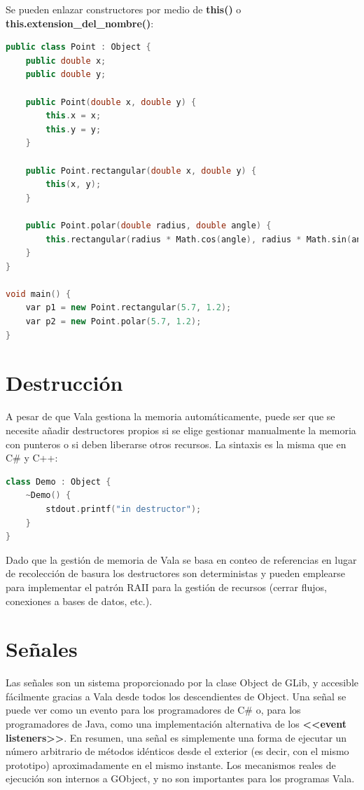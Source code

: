\documentclass[12pt,twoside]{book}
\begin{document}
Se pueden enlazar constructores por medio de \textbf{this()} o \textbf{this.extension\_del\_nombre()}:

\begin{lstlisting}[language=C++]
public class Point : Object {
	public double x;
	public double y;
	
	public Point(double x, double y) {
		this.x = x;
		this.y = y;
	}
	
	public Point.rectangular(double x, double y) {
		this(x, y);
	}
	
	public Point.polar(double radius, double angle) {
		this.rectangular(radius * Math.cos(angle), radius * Math.sin(angle));
	}
}

void main() {
	var p1 = new Point.rectangular(5.7, 1.2);
	var p2 = new Point.polar(5.7, 1.2);
}
\end{lstlisting}

\section{Destrucción}

A pesar de que Vala gestiona la memoria automáticamente, puede ser que se necesite añadir destructores propios si se elige gestionar manualmente la memoria con punteros  o si deben liberarse otros recursos. La sintaxis es la misma que en C\# y C++:

\begin{lstlisting}[language=C++]
class Demo : Object {
	~Demo() {
		stdout.printf("in destructor");
	}
}
\end{lstlisting}

Dado que la gestión de memoria de Vala se basa en conteo de referencias en lugar de recolección de basura los destructores son deterministas y pueden emplearse para implementar el patrón RAII para la gestión de recursos (cerrar flujos, conexiones a bases de datos, etc.).

\section{Señales}

Las señales son un sistema proporcionado por la clase Object de GLib, y accesible fácilmente gracias a Vala desde todos los descendientes de Object. Una señal se puede ver como un evento para los programadores de C\# o, para los programadores de Java, como una implementación alternativa de los \textbf{<<event listeners>>}. En resumen, una señal es simplemente una forma de ejecutar un número arbitrario de métodos idénticos desde el exterior (es decir, con el mismo prototipo) aproximadamente en el mismo instante. Los mecanismos reales de ejecución son internos a GObject, y no son importantes para los programas Vala.
\end{document}
